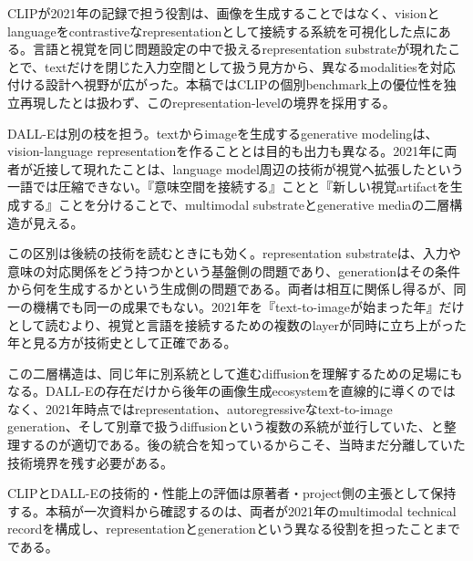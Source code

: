 
CLIPが2021年の記録で担う役割は、画像を生成することではなく、visionとlanguageをcontrastiveなrepresentationとして接続する系統を可視化した点にある。言語と視覚を同じ問題設定の中で扱えるrepresentation substrateが現れたことで、textだけを閉じた入力空間として扱う見方から、異なるmodalitiesを対応付ける設計へ視野が広がった。本稿ではCLIPの個別benchmark上の優位性を独立再現したとは扱わず、このrepresentation-levelの境界を採用する。\autocite{src-005ad180fc46,src-bc37d5969edc}


DALL-Eは別の枝を担う。textからimageを生成するgenerative modelingは、vision-language representationを作ることとは目的も出力も異なる。2021年に両者が近接して現れたことは、language model周辺の技術が視覚へ拡張したという一語では圧縮できない。『意味空間を接続する』ことと『新しい視覚artifactを生成する』ことを分けることで、multimodal substrateとgenerative mediaの二層構造が見える。\autocite{src-009747d6fa68,src-f14c51ae873c}


この区別は後続の技術を読むときにも効く。representation substrateは、入力や意味の対応関係をどう持つかという基盤側の問題であり、generationはその条件から何を生成するかという生成側の問題である。両者は相互に関係し得るが、同一の機構でも同一の成果でもない。2021年を『text-to-imageが始まった年』だけとして読むより、視覚と言語を接続するための複数のlayerが同時に立ち上がった年と見る方が技術史として正確である。\autocite{src-005ad180fc46,src-009747d6fa68,src-bc37d5969edc,src-f14c51ae873c}


この二層構造は、同じ年に別系統として進むdiffusionを理解するための足場にもなる。DALL-Eの存在だけから後年の画像生成ecosystemを直線的に導くのではなく、2021年時点ではrepresentation、autoregressiveなtext-to-image generation、そして別章で扱うdiffusionという複数の系統が並行していた、と整理するのが適切である。後の統合を知っているからこそ、当時まだ分離していた技術境界を残す必要がある。\autocite{src-005ad180fc46,src-009747d6fa68,src-bc37d5969edc,src-f14c51ae873c}


\begin{claimboundary}
CLIPとDALL-Eの技術的・性能上の評価は原著者・project側の主張として保持する。本稿が一次資料から確認するのは、両者が2021年のmultimodal technical recordを構成し、representationとgenerationという異なる役割を担ったことまでである。\autocite{src-005ad180fc46,src-009747d6fa68,src-bc37d5969edc,src-f14c51ae873c}
\end{claimboundary}
